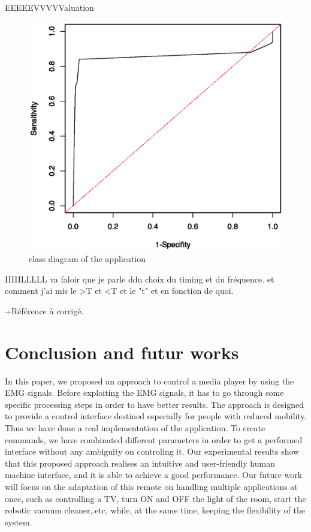 \documentclass[conference]{IEEEtran}
\begin{document}
EEEEEVVVVValuation
\begin{figure}[!hb]
    \includegraphics[scale=0.30]{Figures/Roc.eps}
    \caption{class diagram of the application}
    \label{fig:rocGraph}
\end{figure}

IIIIILLLLL va faloir que je parle ddu choix du timing et du fréquence. et comment j'ai mis le >T et <T et le "t" et en fonction de quoi.

+Référence à corrigé. 



\section{Conclusion and futur works} \label{sec:conclusion}
In this paper, we proposed an approach to control a media player by using the EMG signals. Before exploiting the EMG signals,
it has to go through some specific processing steps in order to have better results. The approach is designed to provide a control interface
destined especially for people with reduced mobility. 
Thus we have done a real implementation of the application. To create commands, we have combinated different parameters in order to get a performed
interface without any ambiguity on controling it. 
Our experimental results show that this proposed approach realises an intuitive and user-friendly human machine interface, and it is able to achieve a
good performance. Our future work will focus on the adaptation of this remote on handling multiple applications at once, such as controlling a TV,
turn ON and OFF the light of the room, start the robotic vacuum cleaner,.etc, while, at the same time, keeping the flexibility of the system.
\end{document}
